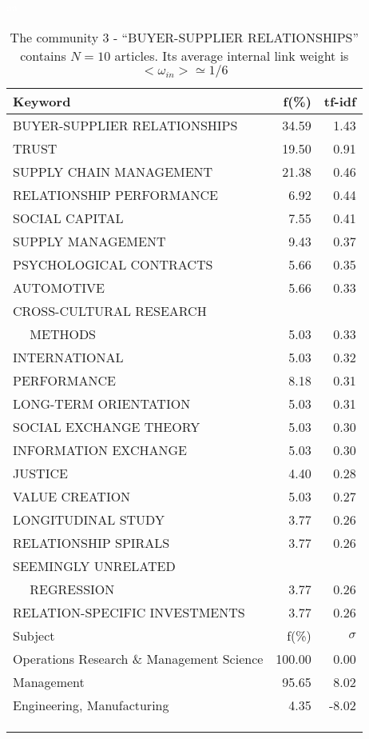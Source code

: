 \documentclass[a4paper,11pt]{report}
\begin{document}
\begin{landscape}
\clearpage

\begin{table}[!ht]
\caption{The community 3 - ``BUYER-SUPPLIER RELATIONSHIPS'' contains $N = 10$ articles. Its average internal link weight is $<\omega_{in}> \simeq 1/6$ }
\textcolor{white}{aa}\\
{\scriptsize\begin{tabular}{|l r  r|}
\hline
Keyword & f(\%) & tf-idf \\
\hline
BUYER-SUPPLIER RELATIONSHIPS & 34.59 & 1.43\\
TRUST & 19.50 & 0.91\\
SUPPLY CHAIN MANAGEMENT & 21.38 & 0.46\\
RELATIONSHIP PERFORMANCE & 6.92 & 0.44\\
SOCIAL CAPITAL & 7.55 & 0.41\\
SUPPLY MANAGEMENT & 9.43 & 0.37\\
PSYCHOLOGICAL CONTRACTS & 5.66 & 0.35\\
AUTOMOTIVE & 5.66 & 0.33\\
CROSS-CULTURAL RESEARCH &  &\\
$\quad$ METHODS & 5.03 & 0.33\\
INTERNATIONAL & 5.03 & 0.32\\
PERFORMANCE & 8.18 & 0.31\\
LONG-TERM ORIENTATION & 5.03 & 0.31\\
SOCIAL EXCHANGE THEORY & 5.03 & 0.30\\
INFORMATION EXCHANGE & 5.03 & 0.30\\
JUSTICE & 4.40 & 0.28\\
VALUE CREATION & 5.03 & 0.27\\
LONGITUDINAL STUDY & 3.77 & 0.26\\
RELATIONSHIP SPIRALS & 3.77 & 0.26\\
SEEMINGLY UNRELATED &  &\\
$\quad$ REGRESSION & 3.77 & 0.26\\
RELATION-SPECIFIC INVESTMENTS & 3.77 & 0.26\\
\hline
\hline
Subject & f(\%) & $\sigma$\\
\hline
Operations Research \& Management Science & 100.00 & 0.00\\
Management & 95.65 & 8.02\\
Engineering, Manufacturing & 4.35 & -8.02\\
 &  & \\
 &  & \\
 &  & \\

\end{tabular}}
\end{table}
\end{landscape}
\end{document}
